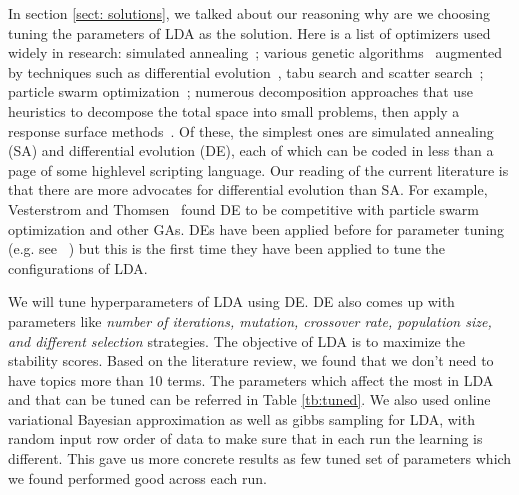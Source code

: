 \documentclass[10pt,conference]{IEEEtran}
\theoremstyle{break}
\begin{document}
In section \ref{sect: solutions}, we talked about our reasoning why are we choosing tuning the parameters of LDA as the solution. Here is a list of optimizers used widely in research: simulated annealing~\cite{feather2002converging, menzies2007business}; various genetic algorithms~\cite{goldberg1979complexity} augmented by techniques such as differential evolution~\cite{storn1997differential}, tabu search and scatter search~\cite{glover1986general, beausoleil2006moss, molina2007sspmo, nebro2008abyss}; particle swarm optimization~\cite{pan2008particle}; numerous decomposition approaches that use heuristics to decompose the total space into small problems, then apply a response surface methods~\cite{krall2015gale, zuluaga2013active}. Of these, the simplest ones are simulated annealing (SA) and differential evolution (DE), each of which can be coded in less than a page of some highlevel scripting language. Our reading of the current literature is that there are more advocates for differential evolution than SA. For example, Vesterstrom and Thomsen~\cite{vesterstrom2004comparative} found DE to be competitive with particle swarm optimization and other GAs. DEs have been applied before for parameter tuning (e.g. see~\cite{omran2005differential, chiha2012tuning, fu2016tuning} ) but this is the first time they have been applied to tune the configurations of LDA.

We will tune hyperparameters of LDA using DE. DE also comes up with parameters like \textit{number of iterations, mutation, crossover rate, population size, and different selection} strategies. The objective of LDA is to maximize the stability scores. Based on the literature review, we found that we don't need to have topics more than 10 terms. The parameters which affect the most in LDA and that can be tuned can be referred in Table \ref{tb:tuned}. We also used online variational Bayesian approximation as well as gibbs sampling for LDA, with random input row order of data to make sure that in each run the learning is different. This gave us more concrete results as few tuned set of parameters which we found performed good across each run.
\end{document}
